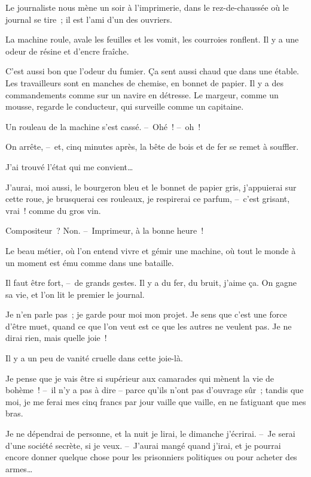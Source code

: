 \documentclass[french,twoside]{book} %
\def\mednobreak{\ifdim\lastskip<\medskipamount
  \removelastskip\nopagebreak\medskip\fi}
\newcommand{\labelblock}[1]{\medbreak{\noindent\color{rubric}\bfseries #1}\par\mednobreak}
\begin{document}
\labelblock{Rue Coq-Héron.}

\noindent Le journaliste nous mène un soir à l’imprimerie, dans le rez-de-chaussée où le journal se tire ; il est l’ami d’un des ouvriers.\par
La machine roule, avale les feuilles et les vomit, les courroies ronflent. Il y a une odeur de résine et d’encre fraîche.\par
C’est aussi bon que l’odeur du fumier. Ça sent aussi chaud que dans une étable. Les travailleurs sont en manches de chemise, en bonnet de papier. Il y a des commandements comme sur un navire en détresse. Le margeur, comme un mousse, regarde le conducteur, qui surveille comme un capitaine.\par
Un rouleau de la machine s’est cassé. – Ohé ! – oh !\par
On arrête, – et, cinq minutes après, la bête de bois et de fer se remet à souffler.\par
\bigbreak
\noindent J’ai trouvé l’état qui me convient…\par
J’aurai, moi aussi, le bourgeron bleu et le bonnet de papier gris, j’appuierai sur cette roue, je brusquerai ces rouleaux, je respirerai ce parfum, – c’est grisant, vrai ! comme du gros vin.\par
Compositeur ? Non. – Imprimeur, à la bonne heure !\par
Le beau métier, où l’on entend vivre et gémir une machine, où tout le monde à un moment est ému comme dans une bataille.\par
Il faut être fort, – de grands gestes. Il y a du fer, du bruit, j’aime ça. On gagne sa vie, et l’on lit le premier le journal.\par
\bigbreak
\noindent Je n’en parle pas ; je garde pour moi mon projet. Je sens que c’est une force d’être muet, quand ce que l’on veut est ce que les autres ne veulent pas. Je ne dirai rien, mais quelle joie !\par
Il y a un peu de vanité cruelle dans cette joie-là.\par
Je pense que je vais être si supérieur aux camarades qui mènent la vie de bohème ! – il n’y a pas à dire – parce qu’ils n’ont pas d’ouvrage sûr ; tandis que moi, je me ferai mes cinq francs par jour vaille que vaille, en ne fatiguant que mes bras.\par
Je ne dépendrai de personne, et la nuit je lirai, le dimanche j’écrirai. – Je serai d’une société secrète, si je veux. – J’aurai mangé quand j’irai, et je pourrai encore donner quelque chose pour les prisonniers politiques ou pour acheter des armes…\par
\end{document}
